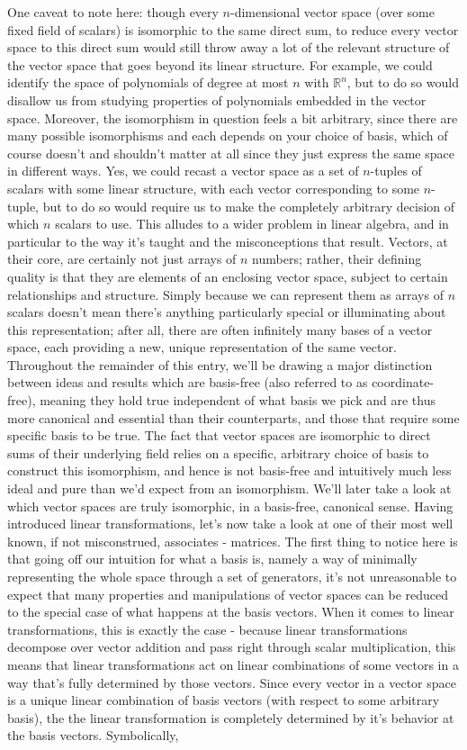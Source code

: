 \documentclass{article}
\newcommand{\nn}{\leavevmode \newline \newline}
\newcommand{\R}{\mathbb{R}}
\begin{document}
One caveat to note here: though every $ n $-dimensional vector space (over some fixed field of scalars) is isomorphic to the same direct sum, to reduce every vector space to this direct sum would still throw away a lot of the relevant structure of the vector space that goes beyond its linear structure. For example, we could identify the space of polynomials of degree at most $ n $ with $ \R^n $, but to do so would disallow us from studying properties of polynomials embedded in the vector space. Moreover, the isomorphism in question feels a bit arbitrary, since there are many possible isomorphisms and each depends on your choice of basis, which of course doesn't and shouldn't matter at all since they just express the same space in different ways. Yes, we could recast a vector space as a set of $ n $-tuples of scalars with some linear structure, with each vector corresponding to some $ n $-tuple, but to do so would require us to make the completely arbitrary decision of which $ n $ scalars to use. This alludes to a wider problem in linear algebra, and in particular to the way it's taught and the misconceptions that result. Vectors, at their core, are certainly not just arrays of $ n $ numbers; rather, their defining quality is that they are elements of an enclosing vector space, subject to certain relationships and structure. Simply because we can represent them as arrays of $ n $ scalars doesn't mean there's anything particularly special or illuminating about this representation; after all, there are often infinitely many bases of a vector space, each providing a new, unique representation of the same vector. Throughout the remainder of this entry, we'll be drawing a major distinction between ideas and results which are basis-free (also referred to as coordinate-free), meaning they hold true independent of what basis we pick and are thus more canonical and essential than their counterparts, and those that require some specific basis to be true. The fact that vector spaces are isomorphic to direct sums of their underlying field relies on a specific, arbitrary choice of basis to construct this isomorphism, and hence is not basis-free and intuitively much less ideal and pure than we'd expect from an isomorphism. We'll later take a look at which vector spaces are truly isomorphic, in a basis-free, canonical sense.
\nn
Having introduced linear transformations, let's now take a look at one of their most well known, if not misconstrued, associates - matrices. The first thing to notice here is that going off our intuition for what a basis is, namely a way of minimally representing the whole space through a set of generators, it's not unreasonable to expect that many properties and manipulations of vector spaces can be reduced to the special case of what happens at the basis vectors. When it comes to linear transformations, this is exactly the case - because linear transformations decompose over vector addition and pass right through scalar multiplication, this means that linear transformations act on linear combinations of some vectors in a way that's fully determined by those vectors. Since every vector in a vector space is a unique linear combination of basis vectors (with respect to some arbitrary basis), the the linear transformation is completely determined by it's behavior at the basis vectors. Symbolically,
\end{document}
